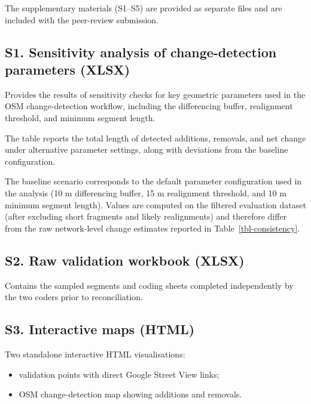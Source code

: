 \documentclass[
]{article}
\providecommand{\tightlist}{%
  \setlength{\itemsep}{0pt}\setlength{\parskip}{0pt}}
\begin{document}
The supplementary materials (S1--S5) are provided as separate files and
are included with the peer-review submission.

\subsection*{S1. Sensitivity analysis of change-detection parameters
(XLSX)}\label{s1-sensitivity}

\color{black}Provides the results of sensitivity checks for key
geometric parameters used in the OSM change-detection workflow,
including the differencing buffer, realignment threshold, and minimum
segment length.\color{black}

\color{black}The table reports the total length of detected additions,
removals, and net change under alternative parameter settings, along
with deviations from the baseline configuration.\color{black}

\color{black}The baseline scenario corresponds to the default parameter
configuration used in the analysis (10 m differencing buffer, 15 m
realignment threshold, and 10 m minimum segment length). Values are
computed on the filtered evaluation dataset (after excluding short
fragments and likely realignments) and therefore differ from the raw
network-level change estimates reported in
Table~\ref{tbl-consistency}.\color{black}

\subsection*{S2. Raw validation workbook (XLSX)}\label{s2-workbook}

Contains the sampled segments and coding sheets completed independently
by the two coders prior to reconciliation.

\subsection*{S3. Interactive maps (HTML)}\label{s3-interactive-maps}

Two standalone interactive HTML visualisations:

\begin{itemize}
\tightlist
\item
  validation points with direct Google Street View links;
\item
  OSM change-detection map showing additions and removals.
\end{itemize}
\end{document}
